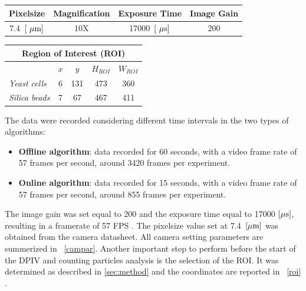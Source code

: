 \documentclass[journal]{IEEEtran}
\theoremstyle{definition}
\theoremstyle{remark}
\begin{document}
\begin{table}[h!]
	\begin{tabular}{@{}llll@{}}
		\toprule
		\textbf{Pixelsize}         & \textbf{Magnification}  & \textbf{Exposure Time}       & \textbf{Image Gain}     \\ \midrule
		\multicolumn{1}{c}{7.4~$[\rm~\mu m]$} & \multicolumn{1}{c}{10X} & \multicolumn{1}{c}{17000~$[\rm~\mu s]$} & \multicolumn{1}{c}{200} \\ \bottomrule
	\end{tabular}
\end{table}

\begin{table}[h!]
	\begin{tabular}{@{}lcccc@{}}
		\toprule
		\multicolumn{5}{c}{\textbf{Region of Interest (ROI)}}                                                                                         \\ \midrule
		& \textbf{$x$} & \textbf{$y$} & \textbf{$H_{ROI}$} & \textbf{$W_{ROI}$} \\
		\textit{Yeast cells}  & 6          & 131        & 473                                          & 360                                          \\
		\textit{Silica beads} & 7          & 67         & 467                                          & 411                                          \\ \bottomrule
	\end{tabular}
\end{table}

The data were recorded considering different time intervals in the two types of algorithms:
\begin{itemize}
	\item \textbf{Offline algorithm}: data recorded for 60 seconds, with a video frame rate of 57 frames per second, around 3420 frames per experiment.
	\item \textbf{Online algorithm}: data recorded for 15 seconds, with a video frame rate of 57 frames per second, around 855 frames per experiment. 
\end{itemize}


The image gain was set equal to 200 and the exposure time equal to 17000 $[\rm\mu s]$, resulting in a framerate of 57 FPS . The pixelsize value set at 7.4~$[\rm\mu m]$ was obtained from the camera datasheet. All camera setting parameters are summerized in ~\tab\ref{campar}.
Another important step to perform before the start of the DPIV and
counting particles analysis is the selection of the ROI.
It was determined as described in \sect\ref{sec:method} and the coordinates are reported in ~\tab\ref{roi} . 
\end{document}
